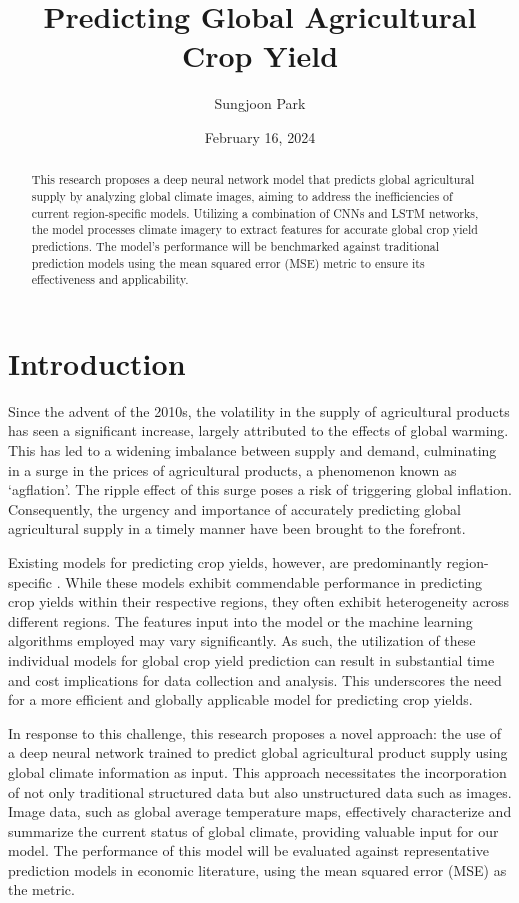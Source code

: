 \documentclass[11pt, oneside]{article}   	%
\title{Predicting Global Agricultural Crop Yield}
\author{Sungjoon Park}
\date{February 16, 2024}		%
\begin{document}
\maketitle
\begin{abstract}
This research proposes a deep neural network model that predicts global agricultural supply by analyzing global climate images, aiming to address the inefficiencies of current region-specific models. Utilizing a combination of CNNs and LSTM networks, the model processes climate imagery to extract features for accurate global crop yield predictions. The model’s performance will be benchmarked against traditional prediction models using the mean squared error (MSE) metric to ensure its effectiveness and applicability.
\end{abstract}

\section*{Introduction}

Since the advent of the 2010s, the volatility in the supply of agricultural products has seen a significant increase, largely attributed to the effects of global warming. This has led to a widening imbalance between supply and demand, culminating in a surge in the prices of agricultural products, a phenomenon known as ‘agflation’. The ripple effect of this surge poses a risk of triggering global inflation. Consequently, the urgency and importance of accurately predicting global agricultural supply in a timely manner have been brought to the forefront.

Existing models for predicting crop yields, however, are predominantly region-specific \cite{citation_key1}\cite{citation_key3}. While these models exhibit commendable performance in predicting crop yields within their respective regions, they often exhibit heterogeneity across different regions. The features input into the model or the machine learning algorithms employed may vary significantly. As such, the utilization of these individual models for global crop yield prediction can result in substantial time and cost implications for data collection and analysis. This underscores the need for a more efficient and globally applicable model for predicting crop yields.

In response to this challenge, this research proposes a novel approach: the use of a deep neural network trained to predict global agricultural product supply using global climate information as input. This approach necessitates the incorporation of not only traditional structured data but also unstructured data such as images. Image data, such as global average temperature maps, effectively characterize and summarize the current status of global climate, providing valuable input for our model. The performance of this model will be evaluated against representative prediction models in economic literature, using the mean squared error (MSE) as the metric.
\end{document}
